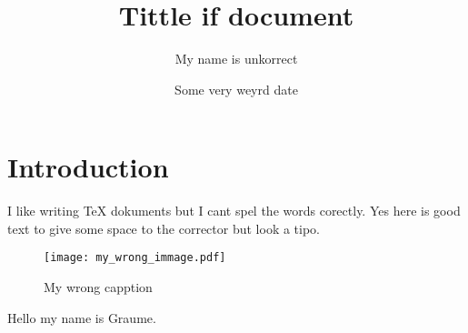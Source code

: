 \documentclass{article}
\title{Tittle if document}
\author{My name is unkorrect}
\date{Some very weyrd date}
\begin{document}
\maketitle

\section{Introduction}

I like writing TeX dokuments but I cant spel the words corectly. Yes here is good text to give some space to the corrector but look a tipo.


\begin{figure}
    \centering
    \texttt{[image: my\_wrong\_immage.pdf]} %
    \caption{My wrong capption} %
    \label{fig:my_wrong_labell} %
\end{figure}


Hello my name is Graume.
\end{document}
